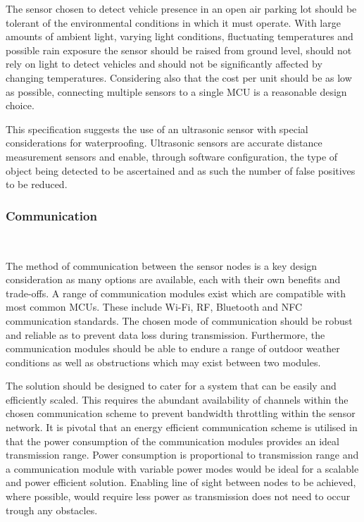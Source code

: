 \documentclass[10pt,twocolumn]{witseiepaper}
\begin{document}
			The sensor chosen to detect vehicle presence in an open air parking lot should be tolerant of the environmental conditions in which it must operate. With large amounts of ambient light, varying light conditions, fluctuating temperatures and possible rain exposure the sensor should be raised from ground level, should not rely on light to detect vehicles and should not be significantly affected by changing temperatures. Considering also that the cost per unit should be as low as possible, connecting multiple sensors to a single MCU is a reasonable design choice.
			 
			This specification suggests the use of an ultrasonic sensor with special considerations for waterproofing. Ultrasonic sensors are accurate distance measurement sensors and enable, through software configuration, the type of object being detected to be ascertained and as such the number of false positives to be reduced.		
			
		\subsubsection{Communication} $   $

			The method of communication between the sensor nodes is a key design consideration as many options are available, each with their own benefits and trade-offs. A range of communication modules exist which are compatible with most common MCUs. These include Wi-Fi, RF, Bluetooth and NFC communication standards. The chosen mode of communication should be robust and reliable as to prevent data loss during transmission. Furthermore, the communication modules should be able to endure a range of outdoor weather conditions as well as obstructions which may exist between two modules.

			The solution should be designed to cater for a system that can be easily and efficiently scaled. This requires the abundant availability of channels within the chosen communication scheme to prevent bandwidth throttling within the sensor network. It is pivotal that an energy efficient communication scheme is utilised in that the power consumption of the communication modules provides an ideal transmission range. Power consumption is proportional to transmission range and a communication module with variable power modes would be ideal for a scalable and power efficient solution. Enabling line of sight between nodes to be achieved, where possible, would require less power as transmission does not need to occur trough any obstacles.
			
\end{document}
